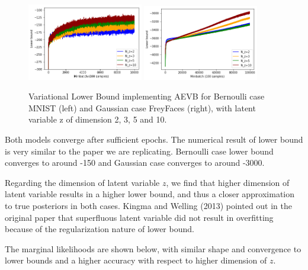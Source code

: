 \documentclass[11pt]{article}
\begin{document}
\begin{figure}[H]
\begin{center}
\includegraphics[width = 0.45\textwidth]{fig/Bernoulli_lb}
\includegraphics[width = 0.45\textwidth]{fig/gaussian-lb}
\caption{Variational Lower Bound implementing AEVB for Bernoulli case MNIST (left) and Gaussian case FreyFaces (right), with latent variable z of dimension 2, 3, 5 and 10.} \label{fig:VB-LB}
\end{center}
\end{figure}

Both models converge after sufficient epochs. The numerical result of lower bound is very similar to the paper we are replicating. Bernoulli case lower bound converges to around -150 and Gaussian case converges to around -3000. %

Regarding the dimension of latent variable $z$, we find that higher dimension of latent variable results in a higher lower bound, and thus a closer approximation to true posteriors in both cases. Kingma and Welling (2013) pointed out in the original paper that superfluous latent variable did not result in overfitting because of the regularization nature of lower bound.

The marginal likelihoods are shown below, with similar shape and convergence to lower bounds and a higher accuracy with respect to higher dimension of $z$.
\end{document}
